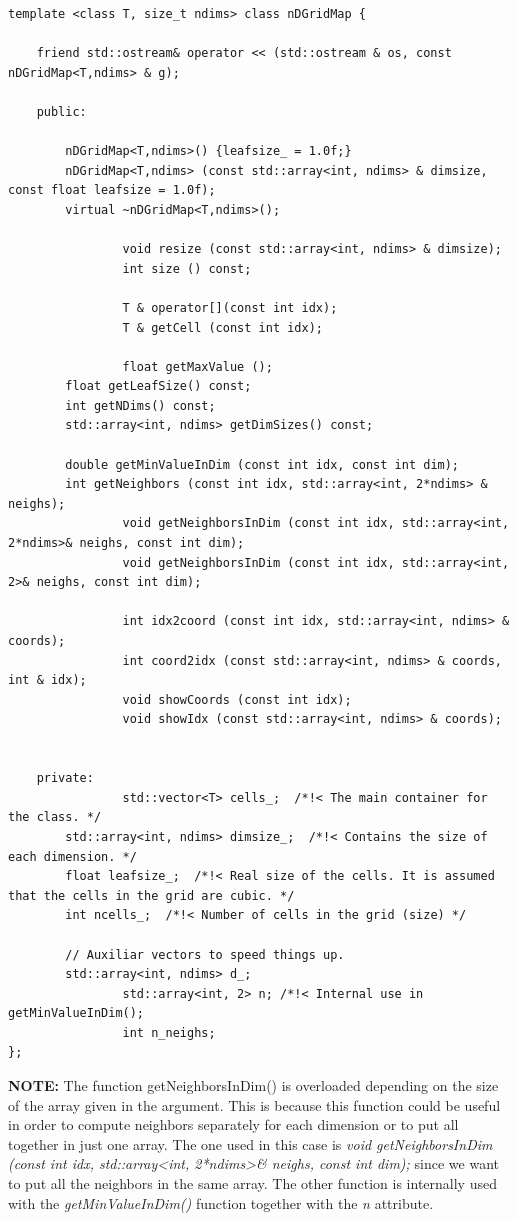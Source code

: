 \documentclass[12pt]{article}
\begin{document}
\begin{lstlisting}
template <class T, size_t ndims> class nDGridMap {
		
	friend std::ostream& operator << (std::ostream & os, const nDGridMap<T,ndims> & g);
	
    public: 
 
        nDGridMap<T,ndims>() {leafsize_ = 1.0f;}
        nDGridMap<T,ndims> (const std::array<int, ndims> & dimsize, const float leafsize = 1.0f);
        virtual ~nDGridMap<T,ndims>();  
        
				void resize (const std::array<int, ndims> & dimsize);
				int size () const;
		
				T & operator[](const int idx);
				T & getCell (const int idx);
			
				float getMaxValue ();
        float getLeafSize() const;
        int getNDims() const;
        std::array<int, ndims> getDimSizes() const;
        
        double getMinValueInDim (const int idx, const int dim);
        int getNeighbors (const int idx, std::array<int, 2*ndims> & neighs); 	
				void getNeighborsInDim (const int idx, std::array<int, 2*ndims>& neighs, const int dim); 	
				void getNeighborsInDim (const int idx, std::array<int, 2>& neighs, const int dim);
		
				int idx2coord (const int idx, std::array<int, ndims> & coords);	
				int coord2idx (const std::array<int, ndims> & coords, int & idx); 
				void showCoords (const int idx); 			
				void showIdx (const std::array<int, ndims> & coords);
				
        
    private:
				std::vector<T> cells_;  /*!< The main container for the class. */
        std::array<int, ndims> dimsize_;  /*!< Contains the size of each dimension. */
        float leafsize_;  /*!< Real size of the cells. It is assumed that the cells in the grid are cubic. */
        int ncells_;  /*!< Number of cells in the grid (size) */
        
        // Auxiliar vectors to speed things up.
        std::array<int, ndims> d_;  
				std::array<int, 2> n; /*!< Internal use in getMinValueInDim();
				int n_neighs;
};
\end{lstlisting}

\textbf{NOTE:} The function getNeighborsInDim() is overloaded depending on the size of the array given in the argument. This is because this function could be useful in order to compute neighbors separately for each dimension or to put all together in just one array. The one used in this case is \emph{void getNeighborsInDim (const int idx, std::array<int, 2*ndims>\& neighs, const int dim);} since we want to put all the neighbors in the same array. The other function is internally used with the \emph{getMinValueInDim()} function together with the \emph{n} attribute.
\end{document}
